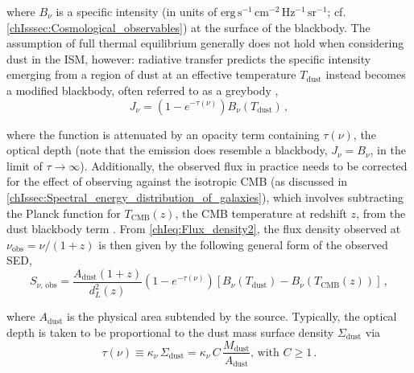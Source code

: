 \noindent where $B_\nu$ is a specific intensity (in units of $\mathrm{erg \, s^{-1} \, cm^{-2} \, Hz^{-1} \, sr^{-1}}$; cf. \cref{chIsssec:Cosmological_observables}) at the surface of the blackbody. The assumption of full thermal equilibrium generally does not hold when considering dust in the ISM, however: radiative transfer predicts the specific intensity emerging from a region of dust at an effective temperature $T_\text{dust}$ instead becomes a modified blackbody, often referred to as a greybody \citep[e.g.][]{2020MNRAS.498.4109J},
\begin{equation}
    \label{chIeq:Dust_radiative_transfer}
    J_\nu = \left( 1 - e^{-\tau (\nu)} \right) B_\nu \left( T_\text{dust} \right) \, ,
\end{equation}

\noindent where the \citeauthor{1901AnP...309..553P} function is attenuated by an opacity term containing $\tau (\nu)$, the optical depth (note that the emission does resemble a blackbody, $J_\nu = B_\nu$, in the limit of $\tau \rightarrow \infty$). Additionally, the observed flux in practice needs to be corrected for the effect of observing against the isotropic CMB (as discussed in \cref{chIssec:Spectral_energy_distribution_of_galaxies}), which involves subtracting the Planck function for $T_\text{CMB} (z)$, the CMB temperature at redshift $z$, from the dust blackbody term \citep[as in equation (18) in][]{2013ApJ...766...13D}. From \cref{chIeq:Flux_density2}, the flux density observed at $\nu_\text{obs} = \nu / (1+z)$ is then given by the following general form of the observed SED,
\begin{equation}
    \label{chIeq:General_dust_SED_flux_density}
    S_{\nu, \, \text{obs}} = \frac{A_\text{dust} \left( 1+z \right)}{d_L^2 (z)} \left( 1 - e^{-\tau (\nu)} \right) \left[ B_\nu \left(T_\text{dust} \right) - B_\nu \left(T_\text{CMB} (z) \right) \right] \, ,
\end{equation}

\noindent where $A_\text{dust}$ is the physical area subtended by the source. Typically, the optical depth is taken to be proportional to the dust mass surface density $\Sigma_\text{dust}$ \citep{2014PhR...541...45C} via
\begin{equation}
    \label{chIeq:Dust_mass_absorption_coefficient_definition}
    \tau (\nu) \equiv \kappa_\nu \, \Sigma_\text{dust} = \kappa_\nu \, C \, \frac{M_\text{dust}}{A_\text{dust}} \text{, with } C \geq 1 \, .
\end{equation}

